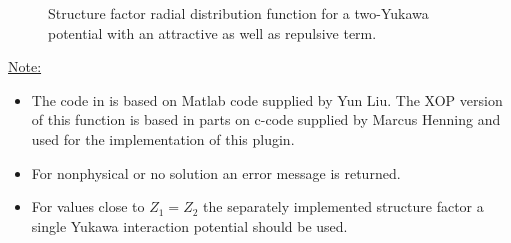 \begin{figure}[htb]
\captionsetup[subfigure]{position=b}
\centering
{}
\hfill
{}
\caption{Structure factor radial distribution function for a two-Yukawa potential with an attractive as well as repulsive term.}
\label{fig:Yukawa}
\end{figure}

\noindent\uline{Note:}
\begin{itemize}
  \item The code in \SASfit is based on Matlab code supplied by Yun Liu. The XOP version of this function is based in parts on c-code supplied by Marcus Henning and used for the implementation of this plugin.
  \item For nonphysical or no solution an error message is returned.
  \item For values close to $Z_1=Z_2$ the separately implemented structure factor a single Yukawa interaction potential should be used.
\end{itemize} 